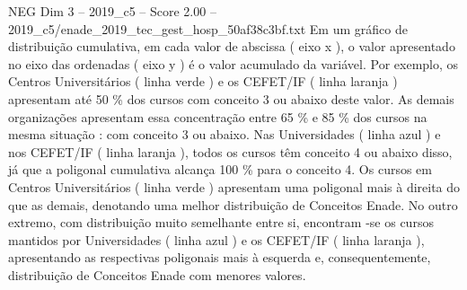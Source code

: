 \begin{textsample}{NEG Dim 3 – 2019\_c5 – Score 2.00 – 2019\_c5/enade\_2019\_tec\_gest\_hosp\_50af38c3bf.txt}
Em um gráfico de distribuição cumulativa, em cada valor de abscissa ( eixo x ), o valor apresentado no eixo das ordenadas ( eixo y ) é o valor acumulado da variável.
Por exemplo, os Centros Universitários ( linha verde ) e os CEFET/IF ( linha laranja ) apresentam até 50 \% dos cursos com conceito 3 ou abaixo deste valor.
As demais organizações apresentam essa concentração entre 65 \% e 85 \% dos cursos na mesma situação : com conceito 3 ou abaixo.
Nas Universidades ( linha azul ) e nos CEFET/IF ( linha laranja ), todos os cursos têm conceito 4 ou abaixo disso, já que a poligonal cumulativa alcança 100 \% para o conceito 4.
Os cursos em Centros Universitários ( linha verde ) apresentam uma poligonal mais à direita do que as demais, denotando uma melhor distribuição de Conceitos Enade.
No outro extremo, com distribuição muito semelhante entre si, encontram -se os cursos mantidos por Universidades ( linha azul ) e os CEFET/IF ( linha laranja ), apresentando as respectivas poligonais mais à esquerda e, consequentemente, distribuição de Conceitos Enade com menores valores.

\end{textsample}
